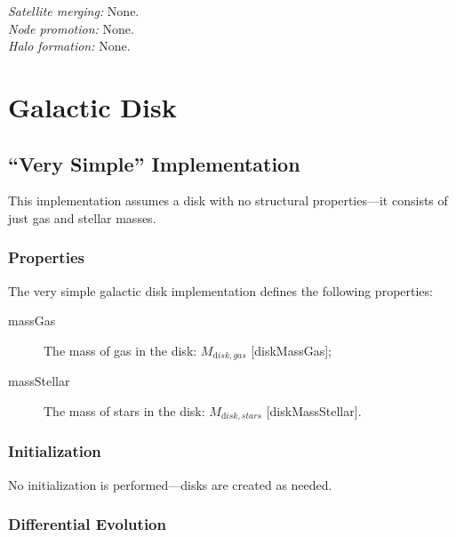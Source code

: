 \noindent\emph{Satellite merging:} None.\\

\noindent\emph{Node promotion:} None.\\ 

\noindent\emph{Halo formation:} None.\\

\section{Galactic Disk}

\subsection{``Very Simple'' Implementation}

This implementation assumes a disk with no structural properties---it consists of just gas and stellar masses.

\subsubsection{Properties}

The very simple galactic disk implementation defines the following properties:
\begin{description}
 \item [{\normalfont \ttfamily massGas}] The mass of gas in the disk: $M_{\mathrm disk, gas}$ [{\normalfont \ttfamily diskMassGas}];
 \item [{\normalfont \ttfamily massStellar}] The mass of stars in the disk: $M_{\mathrm disk, stars}$ [{\normalfont \ttfamily diskMassStellar}].
\end{description}

\subsubsection{Initialization}

No initialization is performed---disks are created as needed.

\subsubsection{Differential Evolution}

